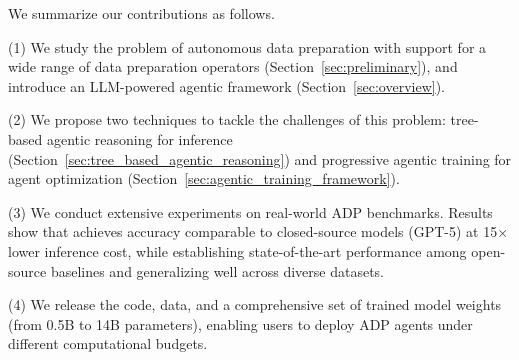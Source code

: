 
We summarize our contributions as follows.

\noindent
(1) We study the problem of autonomous data preparation with support for a wide range of data preparation operators (Section~\ref{sec:preliminary}), and introduce an LLM-powered agentic framework (Section~\ref{sec:overview}).

\noindent
(2) We propose two techniques to tackle the challenges of this problem: tree-based agentic reasoning for inference (Section~\ref{sec:tree_based_agentic_reasoning}) and progressive agentic training for agent optimization (Section~\ref{sec:agentic_training_framework}).

\noindent
(3) We conduct extensive experiments on real-world ADP benchmarks.
Results show that \sys achieves accuracy comparable to closed-source models (\eg GPT-5) at {15$\times$} lower inference cost, while establishing state-of-the-art performance among open-source baselines and generalizing well across diverse datasets.

\noindent
(4) We release the code, data, and a comprehensive set of trained model weights (from 0.5B to 14B parameters), enabling users to deploy ADP agents under different computational budgets.


